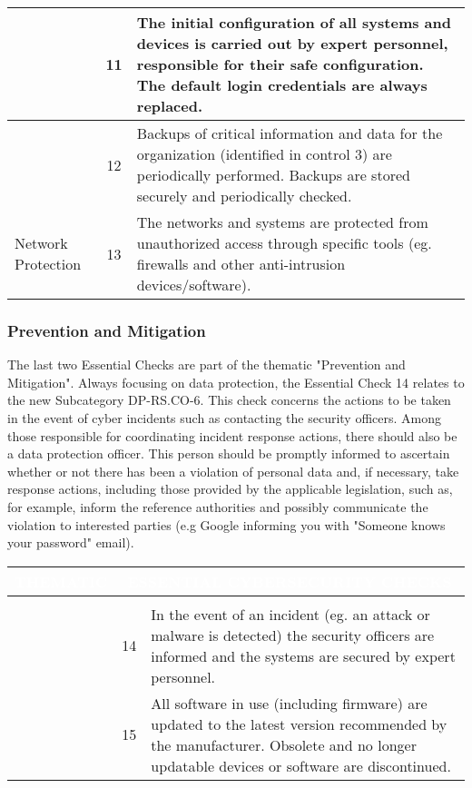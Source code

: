 \begin{table}[H]
\begin{tabularx}{\textwidth}{|>{\centering\arraybackslash}p{}|c|X|}
\hline
\multirow{5}{*}{{Data Protection}} & 11 & {The initial configuration of all systems and devices is carried out by expert personnel, responsible for their safe configuration. The default login credentials are always replaced.}\\ 
\cline{2-3} & 12 & {Backups of critical information and data for the organization (identified in control 3) are periodically performed. Backups are stored securely and periodically checked.}\\ 
\hline
{Network Protection} & 13 & {The networks and systems are protected from unauthorized access through specific tools (eg. firewalls and other anti-intrusion devices/software).} \\ 
\hline
\end{tabularx}
\end{table}
\subsubsection{Prevention and Mitigation}
The last two Essential Checks are part of the thematic "Prevention and Mitigation". Always focusing on data protection, the Essential Check 14 relates to the new Subcategory DP-RS.CO-6. This check concerns the actions to be taken in the event of cyber incidents such as contacting the security officers. Among those responsible for coordinating incident response actions, there should also be a data protection officer. This person should be promptly informed to ascertain whether or not there has been a violation of personal data and, if necessary, take response actions, including those provided by the applicable legislation, such as, for example, inform the reference authorities and possibly communicate the violation to interested parties (e.g Google informing you with "Someone knows your password" email).
\begin{table}[H]
\begin{tabularx}{\textwidth}{|>{\centering\arraybackslash}p{}|c|X|} 
\hline
{\cellcolor{dummy-cyan}}\textbf{\textcolor{white}{THEMATIC}} &
\multicolumn{2}{|c|}{{\cellcolor{dummy-cyan}}\textbf{\textcolor{white}{ESSENTIAL CYBERSECURITY CHECKS}}}\\ \hline
\multirow{5}{*}{\begin{tabular}[c]{@{}c@{}}{Prevention and}\\{Mitigation}\end{tabular}} & 14 & {In the event of an incident (eg. an attack or malware is detected) the security officers are informed and the systems are secured by expert personnel.}\\ 
\cline{2-3} & 15 & {All software in use (including firmware) are updated to the latest version recommended by the manufacturer. Obsolete and no longer updatable devices or software are discontinued.}\\
\hline
\end{tabularx}
\end{table}
